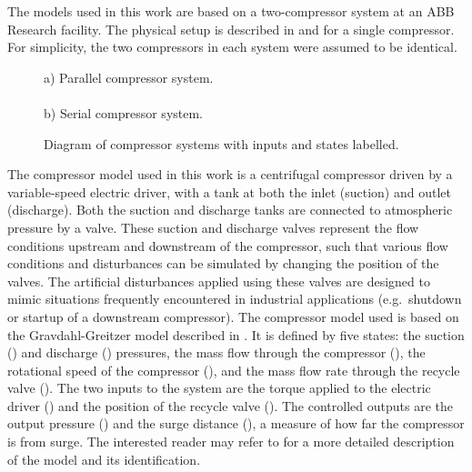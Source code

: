 \label{sec:modelling}
The models used in this work are based on a two-compressor system at an ABB Research facility.
The physical setup is described in \cite{Cortinovis2014} and \cite{Cortinovis2015} for a single compressor.
For simplicity, the two compressors in each system were assumed to be identical.

\begin{figure}
    
    {\centering a) Parallel compressor system.\\}
    \\
    {\centering b) Serial compressor system.\\}
  \caption[Diagram of compressor systems.]{Diagram of compressor systems with inputs and states labelled.}
  \label{fig:comp-systems-diagrams}
\end{figure}


The compressor model used in this work is a centrifugal compressor driven by a variable-speed electric driver, with a tank at both the inlet (suction) and outlet (discharge).
Both the suction and discharge tanks are connected to atmospheric pressure by a valve.
These suction and discharge valves represent the flow conditions upstream and downstream of the compressor, such that various flow conditions and disturbances can be simulated by changing the position of the valves.
The artificial disturbances applied using these valves are designed to mimic situations frequently encountered in industrial applications (e.g.\ shutdown or startup of a downstream compressor).
The compressor model used is based on the Gravdahl-Greitzer model described in \cite{Gravdahl1999}. 
It is defined by five states: the suction () and discharge () pressures, the mass flow through the compressor (), the rotational speed of the compressor (), and the mass flow rate through the recycle valve ().
The two inputs to the system are the torque applied to the electric driver () and the position of the recycle valve ().
The controlled outputs are the output pressure () and the surge distance (), a measure of how far the compressor is from surge.
The interested reader may refer to \cite{Cortinovis2015} for a more detailed description of the model and its identification.

